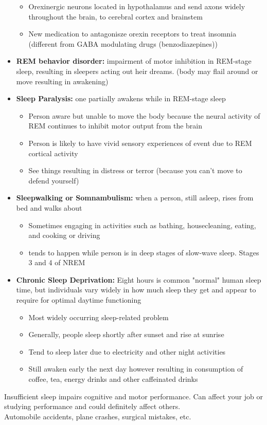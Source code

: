 \documentclass{article}
\begin{document}
\begin{itemize}
\begin{itemize}
            \item Orexinergic neurons located in hypothalamus and send axons widely throughout the brain, to cerebral cortex and brainstem
            \item New medication to antagonisze orexin receptors to treat insomnia (different from GABA modulating drugs (benzodiazepines))
        \end{itemize}
    \item \textbf{REM behavior disorder:} impairment of motor inhibition in REM-stage sleep, resulting in sleepers acting out heir dreams. (body may flail around or move resulting in awakening)
    \item \textbf{Sleep Paralysis:} one partially awakens while in REM-stage sleep
        \begin{itemize}
            \item Person aware but unable to move the body because the neural activity of REM continues to inhibit motor output from the brain
            \item Person is likely to have vivid sensory experiences of event due to REM cortical activity
            \item See things resulting in distress or terror (because you can't move to defend yourself)
        \end{itemize}
    \item \textbf{Sleepwalking or Somnambulism:} when a person, still asleep, rises from bed and walks about
        \begin{itemize}
            \item Sometimes engaging in activities such as bathing, housecleaning, eating, and cooking or driving
            \item tends to happen while person is in deep stages of slow-wave sleep. Stages 3 and 4 of NREM
        \end{itemize}
    \item \textbf{Chronic Sleep Deprivation:} Eight hours is common "normal" human sleep time, but individuals vary widely in how much sleep they get and appear to require for optimal daytime functioning
        \begin{itemize}
            \item Most widely occurring sleep-related problem
            \item Generally, people sleep shortly after sunset and rise at sunrise
            \item Tend to sleep later due to electricity and other night activities
            \item Still awaken early the next day however resulting in consumption of coffee, tea, energy drinks and other caffeinated drinks
        \end{itemize}
\end{itemize}
Insufficient sleep impairs cognitive and motor performance. Can affect your job or studying performance and could definitely affect others. \\
Automobile accidents, plane crashes, surgical mistakes, etc. 
\end{document}
